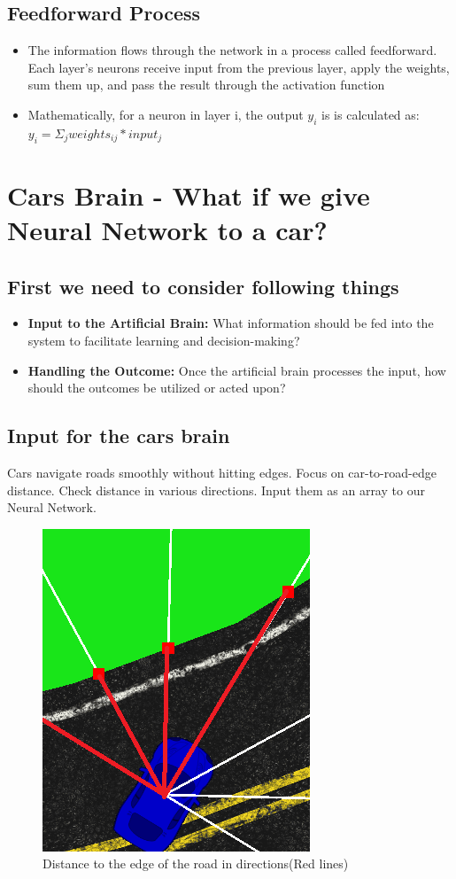 \documentclass[10pt,a4paper]{article}
\begin{document}
\subsection{Feedforward Process}
\begin{itemize}
\item The information flows through the network in a process called feedforward. Each layer's neurons receive input from the previous layer, apply the weights, sum them up, and pass the result through the activation function
\item Mathematically, for a neuron in layer i, the output $y_{i}$ is is calculated as: $y_{i}=\Sigma_{j} weights_{ij}*input_{j}$

\end{itemize}
\section{Cars Brain - What if we give Neural Network to a car?}
\subsection{First we need to consider following things}
\begin{itemize}
    \item \textbf{Input to the Artificial Brain:} What information should be fed into the system to facilitate learning and decision-making?
    \item \textbf{Handling the Outcome:} Once the artificial brain processes the input, how should the outcomes be utilized or acted upon?
\end{itemize}
\subsection{Input for the cars brain}
Cars navigate roads smoothly without hitting edges.
Focus on car-to-road-edge distance.
Check distance in various directions.
Input them as an array to our Neural Network.
\begin{figure}[!h]
	\centering
    \includegraphics[scale=0.5]{cardist.png}
	\centering
    \caption{\tiny Distance to the edge of the road in directions(Red lines)}
\end{figure}
\end{document}
